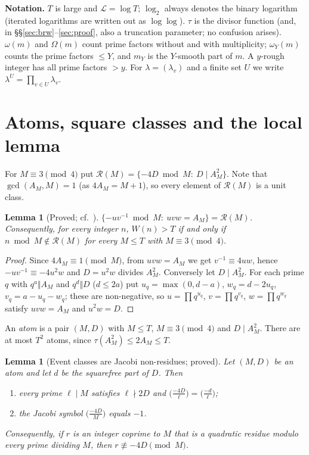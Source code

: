 \documentclass[11pt,reqno]{amsart}
\newtheorem{lemma}[theorem]{Lemma}
\theoremstyle{definition}
\newcommand{\cR}{\mathcal R}
\newcommand{\Lc}{\mathcal L}
\begin{document}
\smallskip\noindent\textbf{Notation.}  $T$ is large and $\Lc=\log T$;
$\log_2$ always denotes the binary logarithm (iterated logarithms are
written out as $\log\log$).  $\tau$ is the divisor function (and, in
\S\S\ref{sec:brw}--\ref{sec:proof}, also a truncation parameter; no confusion
arises).  $\omega(m)$ and $\Omega(m)$ count prime factors without and with
multiplicity; $\omega_Y(m)$ counts the prime factors $\le Y$, and $m_Y$ is the
$Y$-smooth part of $m$.  A $y$-rough integer has all prime factors $>y$.
For $\lambda=(\lambda_v)$ and a finite set $U$ we write $\lambda^U=\prod_{v\in U}\lambda_v$.


\section{Atoms, square classes and the local lemma}\label{sec:system}

For $M\equiv3\pmod4$ put $\cR(M)=\{-4D\bmod M:\ D\mid A_M^2\}$.  Note that
$\gcd(A_M,M)=1$ (as $4A_M=M+1$), so every element of $\cR(M)$ is a unit
class.

\begin{lemma}[Proved; cf.\ {\cite{Paper1}}]\label{lem:atoms}
$\{-uv^{-1}\bmod M:\ uvw=A_M\}=\cR(M)$.  Consequently, for every integer $n$,
$W(n)>T$ if and only if $n\bmod M\notin\cR(M)$ for every $M\le T$ with
$M\equiv3\pmod4$.
\end{lemma}

\begin{proof}
Since $4A_M\equiv1\pmod M$, from $uvw=A_M$ we get $v^{-1}\equiv4uw$, hence
$-uv^{-1}\equiv-4u^2w$ and $D=u^2w$ divides $A_M^2$.  Conversely let
$D\mid A_M^2$.  For each prime $q$ with $q^a\Vert A_M$ and $q^d\Vert D$
($d\le2a$) put $u_q=\max(0,d-a)$, $w_q=d-2u_q$, $v_q=a-u_q-w_q$; these are
non-negative, so $u=\prod q^{u_q}$, $v=\prod q^{v_q}$, $w=\prod q^{w_q}$
satisfy $uvw=A_M$ and $u^2w=D$.
\end{proof}

An \emph{atom} is a pair $(M,D)$ with $M\le T$, $M\equiv3\pmod4$ and
$D\mid A_M^2$.  There are at most $T^2$ atoms, since $\tau(A_M^2)\le2A_M\le T$.

\begin{lemma}[Event classes are Jacobi non-residues; proved]\label{lem:jacobi}
Let $(M,D)$ be an atom and let $d$ be the squarefree part of $D$.  Then
\begin{enumerate}
\item[(a)] every prime $\ell\mid M$ satisfies $\ell\nmid 2D$ and
$\big(\frac{-4D}{\ell}\big)=\big(\frac{-d}{\ell}\big)$;
\item[(b)] the Jacobi symbol $\big(\frac{-4D}{M}\big)$ equals $-1$.
\end{enumerate}
Consequently, if $r$ is an integer coprime to $M$ that is a quadratic residue
modulo every prime dividing $M$, then $r\not\equiv-4D\pmod M$.
\end{lemma}
\end{document}
